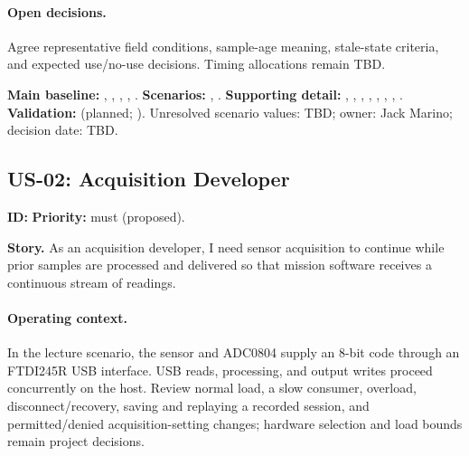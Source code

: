 \paragraph{Open decisions.} Agree representative field conditions, sample-age meaning, stale-state criteria, and expected use/no-use decisions. Timing allocations remain TBD.

\begingroup\raggedright
\noindent\textbf{Main baseline:} , , , , .
\noindent\textbf{Scenarios:} , .
\noindent\textbf{Supporting detail:} , , , , , , , .
\noindent\textbf{Validation:}  (planned; \StatusPending). Unresolved scenario values: TBD; owner: Jack Marino; decision date: TBD.\par\endgroup

\subsection{US-02: Acquisition Developer}
\noindent\textbf{ID:} \quad\textbf{Priority:} \gls{must} (proposed).

\noindent\textbf{Story.} As an acquisition developer, I need sensor acquisition to continue while prior samples are processed and delivered so that mission software receives a continuous stream of readings.

\paragraph{Operating context.} In the lecture scenario, the sensor and ADC0804 supply an 8-bit code through an FTDI245R USB interface. USB reads, processing, and output writes proceed concurrently on the host. Review normal load, a slow consumer, overload, disconnect/recovery, saving and replaying a recorded session, and permitted/denied acquisition-setting changes; hardware selection and load bounds remain project decisions.


